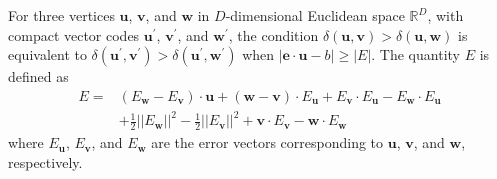 \begin{myTheorem}
\label{the: Dist. Comp.}
{
For three vertices $\boldsymbol{u}$, $\boldsymbol{v}$, and $\boldsymbol{w}$ in $D$-dimensional Euclidean space $\mathbb{R}^D$, with compact vector codes $\boldsymbol{u}^{\prime}$, $\boldsymbol{v}^{\prime}$, and $\boldsymbol{w}^{\prime}$, the condition $\delta(\boldsymbol{u}, \boldsymbol{v}) > \delta(\boldsymbol{u}, \boldsymbol{w})$ is equivalent to $\delta(\boldsymbol{u}^{\prime}, \boldsymbol{v}^{\prime}) > \delta(\boldsymbol{u}^{\prime}, \boldsymbol{w}^{\prime})$ when $|\boldsymbol{e} \cdot \boldsymbol{u} - b|\geq |E|$. The quantity $E$ is defined as
\begin{equation}
\begin{aligned}
    E = &(E_{\boldsymbol{w}}-E_{\boldsymbol{v}}) \cdot \boldsymbol{u} + (\boldsymbol{w}-\boldsymbol{v})\cdot E_{\boldsymbol{u}} + E_{\boldsymbol{v}} \cdot E_{\boldsymbol{u}} - E_{\boldsymbol{w}}\cdot E_{\boldsymbol{u}}\\
    &+ \frac{1}{2}||E_{\boldsymbol{w}}||^2-\frac{1}{2}||E_{\boldsymbol{v}}||^2 +\boldsymbol{v}\cdot E_{\boldsymbol{v}}-\boldsymbol{w}\cdot E_{\boldsymbol{w}}
\end{aligned}
\end{equation}
where $E_{\boldsymbol{u}}$, $E_{\boldsymbol{v}}$, and $E_{\boldsymbol{w}}$ are the error vectors corresponding to $\boldsymbol{u}$, $\boldsymbol{v}$, and $\boldsymbol{w}$, respectively.
}

\end{myTheorem}

